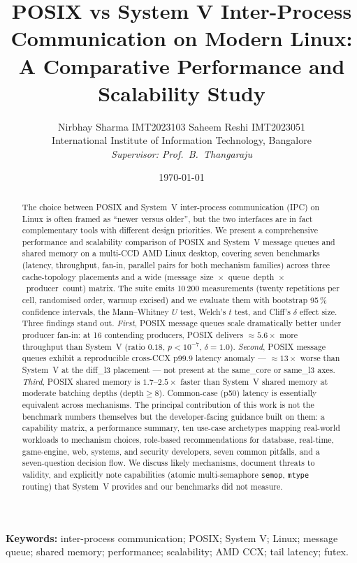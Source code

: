 \documentclass[a4paper,11pt]{article}
\title{POSIX vs System V Inter-Process Communication on Modern Linux:\\
A Comparative Performance and Scalability Study}
\author{Nirbhay Sharma IMT2023103 Saheem Reshi IMT2023051\\[2pt]
\small International Institute of Information Technology, Bangalore\\[2pt]
\small\textit{Supervisor: Prof.\ B.~Thangaraju}}
\date{\today}
\begin{document}
\maketitle

\begin{abstract}
\noindent
The choice between POSIX and System~V inter-process communication (IPC) on
Linux is often framed as ``newer versus older'', but the two interfaces are in
fact complementary tools with different design priorities. We present a
comprehensive performance and scalability comparison of POSIX and System~V
message queues and shared memory on a multi-CCD AMD Linux desktop, covering
seven benchmarks (latency, throughput, fan-in, parallel pairs for both
mechanism families) across three cache-topology placements and a wide
\mbox{(message size $\times$ queue depth $\times$ producer count)} matrix. The
suite emits 10\,200 measurements (twenty repetitions per cell, randomised
order, warmup excised) and we evaluate them with bootstrap 95\,\% confidence
intervals, the Mann--Whitney $U$ test, Welch's $t$ test, and Cliff's $\delta$
effect size. Three findings stand out. \emph{First}, POSIX message queues
scale dramatically better under producer fan-in: at 16 contending producers,
POSIX delivers $\approx 5.6\times$ more throughput than System~V (ratio
$0.18$, $p<10^{-7}$, $\delta=1.0$). \emph{Second}, POSIX message queues
exhibit a reproducible cross-CCX p99.9 latency anomaly --- $\approx 13\times$
worse than System~V at the diff\_l3 placement --- not present at the same\_core
or same\_l3 axes. \emph{Third}, POSIX shared memory is $1.7$--$2.5\times$
faster than System~V shared memory at moderate batching depths
($\text{depth}\geq 8$). Common-case (p50) latency is essentially equivalent
across mechanisms. The principal contribution of this work is not the
benchmark numbers themselves but the developer-facing guidance built
on them: a capability matrix, a performance summary, ten use-case
archetypes mapping real-world workloads to mechanism choices,
role-based recommendations for database, real-time, game-engine, web,
systems, and security developers, seven common pitfalls, and a
seven-question decision flow. We discuss likely mechanisms, document
threats to validity, and explicitly note capabilities (atomic
multi-semaphore \texttt{semop}, \texttt{mtype} routing) that
System~V provides and our benchmarks did not measure.
\end{abstract}

\smallskip
\noindent\textbf{Keywords:} inter-process communication; POSIX; System V;
Linux; message queue; shared memory; performance; scalability; AMD CCX;
tail latency; futex.
\end{document}
